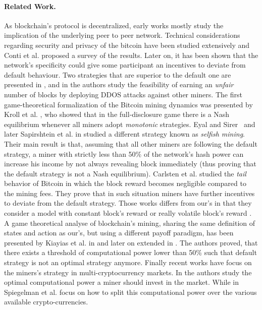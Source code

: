 \paragraph*{\bf Related Work.} As blockchain's protocol is decentralized, early works mostly study the implication of the underlying peer to peer network. Technical considerations regarding security and privacy of the bitcoin have been studied extensively and Conti et al. \cite{conti2018survey} proposed a survey of the results. Later on, it has been shown that the network's specificity could give some participant an incentives to deviate from default behaviour. Two strategies that are superior to the default one are presented in \cite{bitcoin_attacks_2013}, and in\cite{ddos_attacks2014,empirical_dos_attacks2014} the authors study the feasibility of earning an \emph{unfair} number of blocks by deploying DDOS attacks against other miners. The first game-theoretical formalization of the Bitcoin mining dynamics was presented by Kroll et al. \cite{economics_of_mining2013}, who showed that in the full-disclosure game there is a Nash equilibrium whenever all miners adopt \emph{monotonic} strategies. Eyal and Sirer~\cite{selfishmining2014}  and later Sapirshtein et al. in \cite{optimalselfishmining2017} studied a different strategy known as \emph{selfish mining}. Their main result is that, assuming that all other miners are following the default strategy, a miner with strictly less than 50\% of the network's hash power can increase his income by not always revealing block immediately (thus proving that the default strategy is not a Nash equilibrium). Carlsten et al. \cite{instabilitywithoutreward:2016} studied the \emph{tail} behavior of Bitcoin in which the block reward becomes negligible compared to the mining fees. They prove that in such situation miners have further incentives to deviate from the default strategy. Those works differs from our's in that they consider a model with constant block's reward \cite{selfishmining2014,optimalselfishmining2017} or really volatile block's reward \cite{nstabilitywithoutreward:2016}. A game theoretical analyse of blockchain's mining, sharing the same definition of states and action as our's, but using a different payoff paradigm, has been presented by Kiayias et al. in \cite{mininggames:2016} and later on extended in \cite{koutsoupias2018blockchain}. The authors proved, that there exists a threshold of computational power lower than 50\% such that default strategy is not an optimal strategy anymore. Finally recent works have focus on the miners's strategy in multi-cryptocurrency markets. In \cite{dhamal2018stochastic} the authors study the optimal computational power a miner should invest in the market. While in \cite{spiegelman2018game} Spiegelman et al. focus on how to split this computational power over the various available crypto-currencies.